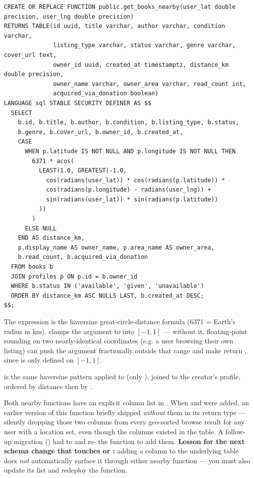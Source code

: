 \begin{lstlisting}[style=olkcodesql, caption={get\_books\_nearby — haversine distance, nulls last}]
CREATE OR REPLACE FUNCTION public.get_books_nearby(user_lat double precision, user_lng double precision)
RETURNS TABLE(id uuid, title varchar, author varchar, condition varchar,
              listing_type varchar, status varchar, genre varchar, cover_url text,
              owner_id uuid, created_at timestamptz, distance_km double precision,
              owner_name varchar, owner_area varchar, read_count int,
              acquired_via_donation boolean)
LANGUAGE sql STABLE SECURITY DEFINER AS $$
  SELECT
    b.id, b.title, b.author, b.condition, b.listing_type, b.status,
    b.genre, b.cover_url, b.owner_id, b.created_at,
    CASE
      WHEN p.latitude IS NOT NULL AND p.longitude IS NOT NULL THEN
        6371 * acos(
          LEAST(1.0, GREATEST(-1.0,
            cos(radians(user_lat)) * cos(radians(p.latitude)) *
            cos(radians(p.longitude) - radians(user_lng)) +
            sin(radians(user_lat)) * sin(radians(p.latitude))
          ))
        )
      ELSE NULL
    END AS distance_km,
    p.display_name AS owner_name, p.area_name AS owner_area,
    b.read_count, b.acquired_via_donation
  FROM books b
  JOIN profiles p ON p.id = b.owner_id
  WHERE b.status IN ('available', 'given', 'unavailable')
  ORDER BY distance_km ASC NULLS LAST, b.created_at DESC;
$$;
\end{lstlisting}

\begin{olknote}
The  expression is the haversine great-circle-distance formula (6371 = Earth's radius in km).  clamps the argument to  into $[-1, 1]$ — without it, floating-point rounding on two nearly-identical coordinates (e.g. a user browsing their own listing) can push the argument fractionally outside that range and make  return , since  is only defined on $[-1,1]$.
\end{olknote}

 is the same haversine pattern applied to  (only ), joined to the creator's profile, ordered by distance then by .

\begin{olkgotcha}
Both nearby functions have an explicit column list in . When  and  were added, an earlier version of this function briefly shipped \emph{without} them in its return type — silently dropping those two columns from every geo-sorted browse result for any user with a location set, even though the columns existed in the table. A follow-up migration () had to  and re- the function to add them. \textbf{Lesson for the next schema change that touches  or :} adding a column to the underlying table does \emph{not} automatically surface it through either nearby function — you must also update its  list and redeploy the function.
\end{olkgotcha}

